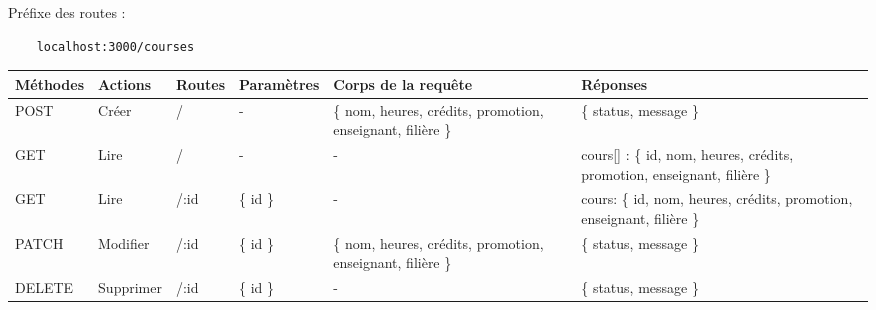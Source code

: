 Préfixe des routes :
\begin{lstlisting}
    localhost:3000/courses
\end{lstlisting}

\begin{center}
    \begin{tabularx}{1\textwidth} {
            | >{\raggedright\arraybackslash}X
            | >{\centering\arraybackslash}X
            | >{\centering\arraybackslash}X
            | >{\centering\arraybackslash}X
            | >{\centering\arraybackslash}X
            | >{\raggedleft\arraybackslash}X |
        }
        \hline
            Méthodes & Actions & Routes & Paramètres & Corps de la requête & Réponses \\
        \hline
            POST  & Créer & / &  - &  \{ nom, heures, crédits, promotion, enseignant, filière \} & \{ status, message \} \\
        \hline
            GET  & Lire &  / & - & - & cours[] :  \{ id, nom, heures, crédits, promotion, enseignant, filière \} \\
        \hline
            GET  & Lire & /:id & \{ id \} & - & cours: \{ id, nom, heures, crédits, promotion, enseignant, filière \} \\
        \hline
            PATCH  & Modifier & /:id & \{ id \} &  \{ nom, heures, crédits, promotion, enseignant, filière \} & \{ status, message \} \\
        \hline
            DELETE & Supprimer  & /:id & \{ id \} & - & \{ status, message \} \\
        \hline
    \end{tabularx}
\end{center}
\pagebreak

